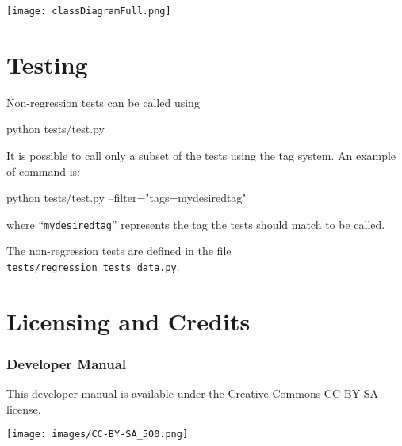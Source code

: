 \newpage
\begin{landscape}
\begin{changemargin}{-2.cm}{-3cm}
\thispagestyle{empty}
\texttt{[image: classDiagramFull.png]}
\end{changemargin}
\end{landscape}
\newpage



\chapter{Testing}

Non-regression tests can be called using


\begin{terminal}
python tests/test.py
\end{terminal}

It is possible to call only a subset of the tests using the tag system.
An example of command is:

\begin{terminal}
python tests/test.py --filter="tags=mydesiredtag"
\end{terminal}

\noindent{}where ``\texttt{mydesiredtag}'' represents the tag the tests should match to be called.

The non-regression tests are defined in the file \texttt{tests/regression\_tests\_data.py}.


\chapter{Licensing and Credits}


\subsection*{Developer Manual}
This developer manual is available under the Creative Commons CC-BY-SA license.

\begin{center}
	\texttt{[image: images/CC-BY-SA\_500.png]}
\end{center}











